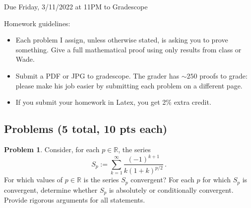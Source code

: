 \documentclass[11pt]{article}
\theoremstyle{definition}
\newtheorem{problem}{Problem}
\newcommand{\N}{\mathbb{N}}
\newcommand{\R}{\mathbb{R}}
\begin{document}
  \hfill Due Friday, 3/11/2022 at 11PM to Gradescope

\bigskip

\noindent Homework guidelines: 
\begin{itemize}
\item Each problem I assign, unless otherwise stated, is asking you to prove something. Give a full mathematical proof using only results from class or Wade.
\item Submit a PDF or JPG to gradescope. The grader has $\sim 250$ proofs to grade:  please make his job easier by submitting each problem on a different page. 
\item If you submit your homework in Latex, you get 2\% extra credit. 
\end{itemize}

\subsection*{Problems (5 total, 10 pts each)}

\begin{problem}
Consider, for each $p \in \R$, the series
\[
S_p := \sum_{k = 1}^\infty \frac{(-1)^{k + 1} }{k (1 + k)^{p/2}} \,. 
\]
For which values of $p \in \R$ is the series $S_p$ convergent? For each $p$ for which $S_p$ is convergent, determine whether $S_p$ is absolutely or conditionally convergent. Provide rigorous arguments for all statements. 
\end{problem}

\end{document}
